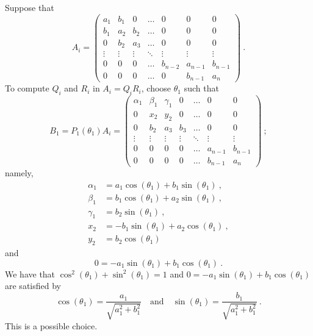 Suppose that
\[
A_i =
\begin{pmatrix}
a_1 & b_1 & 0 & \ldots & 0 & 0 & 0 \\
b_1 & a_2 & b_2 & \ldots & 0 & 0 & 0 \\
0 & b_2 & a_3 & \ldots & 0 & 0 & 0 \\
\vdots & \vdots & \vdots & \ddots & \vdots & \vdots & \vdots \\
0 & 0 & 0 & \ldots & b_{n-2} & a_{n-1} & b_{n-1} \\
0 & 0 & 0 & \ldots & 0 & b_{n-1} & a_n
\end{pmatrix}
\ .
\]
To compute $Q_i$ and $R_i$ in $A_i = Q_iR_i$, choose $\theta_1$ such
that
\[
B_1 = P_1(\theta_1) A_i =
\begin{pmatrix}
\alpha_1 & \beta_1 & \gamma_1 & 0 & \ldots & 0 & 0 \\
0 & x_2 & y_2 & 0 & \ldots & 0 & 0 \\
0 & b_2 & a_3 & b_3 & \ldots & 0 & 0 \\
\vdots & \vdots & \vdots & \vdots & \ddots & \vdots & \vdots \\
0 & 0 & 0 & 0 & \ldots & a_{n-1} & b_{n-1} \\
0 & 0 & 0 & 0 & \ldots & b_{n-1} & a_n
\end{pmatrix} \ ;
\]
namely,
\begin{equation}\label{C14L34}
\begin{split}
\alpha_1 &= a_1 \cos(\theta_1) + b_1 \sin(\theta_1) \ , \\
\beta_1 &= b_1 \cos(\theta_1) + a_2 \sin(\theta_1) \ , \\
\gamma_1 &= b_2 \sin(\theta_1) \ , \\
x_2 &= - b_1 \sin(\theta_1) + a_2 \cos(\theta_1) \ , \\
y_2 & = b_2 \cos(\theta_1)
\end{split}
\end{equation}
and
\[
0 = -a_1 \sin(\theta_1) + b_1 \cos(\theta_1) \ .
\]
We have that $\cos^2(\theta_1)+\sin^2(\theta_1) = 1$ and
$0 = -a_1 \sin(\theta_1) + b_1 \cos(\theta_1)$ are satisfied by
\begin{equation} \label{C14L35}
\cos(\theta_1) = \frac{a_1}{\sqrt{a_1^2 + b_1^2}} \quad \text{and} \quad
\sin(\theta_1) = \frac{b_1}{\sqrt{a_1^2 + b_1^2}} \ .
\end{equation}
This is a possible choice.

